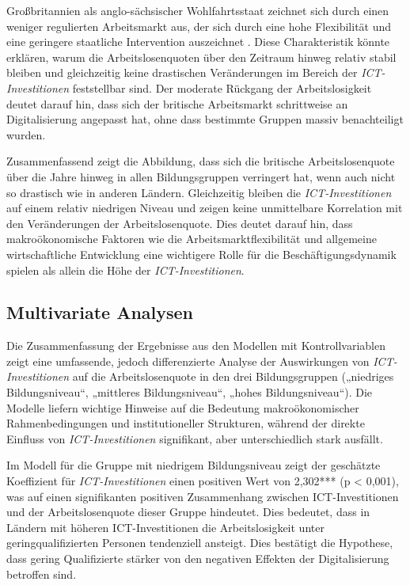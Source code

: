 Großbritannien als anglo-sächsischer Wohlfahrtsstaat zeichnet sich durch einen 
weniger regulierten Arbeitsmarkt aus, der sich durch eine hohe Flexibilität und eine 
geringere staatliche Intervention auszeichnet \parencite[vgl.][S. 21]{trabert1997entwicklung}. 
Diese Charakteristik könnte erklären, warum die Arbeitslosenquoten über den Zeitraum hinweg 
relativ stabil bleiben und gleichzeitig keine drastischen Veränderungen im Bereich der 
\textit{\ac{ICT}-Investitionen} feststellbar sind. Der moderate Rückgang der Arbeitslosigkeit 
deutet darauf hin, dass sich der britische Arbeitsmarkt schrittweise an Digitalisierung angepasst 
hat, ohne dass bestimmte Gruppen massiv benachteiligt wurden.

Zusammenfassend zeigt die Abbildung, dass sich die britische Arbeitslosenquote über die 
Jahre hinweg in allen Bildungsgruppen verringert hat, wenn auch nicht so drastisch wie in 
anderen Ländern. Gleichzeitig bleiben die \textit{\ac{ICT}-Investitionen} auf einem 
relativ niedrigen Niveau und zeigen keine unmittelbare Korrelation mit den Veränderungen 
der Arbeitslosenquote. Dies deutet darauf hin, dass makroökonomische Faktoren wie die 
Arbeitsmarktflexibilität und allgemeine wirtschaftliche Entwicklung eine wichtigere Rolle 
für die Beschäftigungsdynamik spielen als allein die Höhe der \textit{\ac{ICT}-Investitionen}.



\subsection{Multivariate Analysen}

Die Zusammenfassung der Ergebnisse aus den Modellen mit Kontrollvariablen zeigt eine 
umfassende, jedoch differenzierte Analyse der Auswirkungen von 
\textit{\ac{ICT}-Investitionen} auf die Arbeitslosenquote in den drei Bildungsgruppen 
(„niedriges Bildungsniveau“, „mittleres Bildungsniveau“, „hohes Bildungsniveau“). Die
Modelle liefern wichtige Hinweise auf die Bedeutung makroökonomischer Rahmenbedingungen
und institutioneller Strukturen, während der direkte Einfluss von
\textit{\ac{ICT}-Investitionen} signifikant, aber unterschiedlich stark ausfällt.



Im Modell für die Gruppe mit niedrigem Bildungsniveau zeigt der geschätzte Koeffizient
für \textit{\ac{ICT}-Investitionen} einen positiven Wert von 2,302*** (p < 0,001), was auf
einen signifikanten positiven Zusammenhang zwischen \ac{ICT}-Investitionen und der
Arbeitslosenquote dieser Gruppe hindeutet. Dies bedeutet, dass in Ländern mit
höheren \ac{ICT}-Investitionen die Arbeitslosigkeit unter geringqualifizierten Personen
tendenziell ansteigt. Dies bestätigt die Hypothese, dass gering Qualifizierte stärker von
den negativen Effekten der Digitalisierung betroffen sind.

